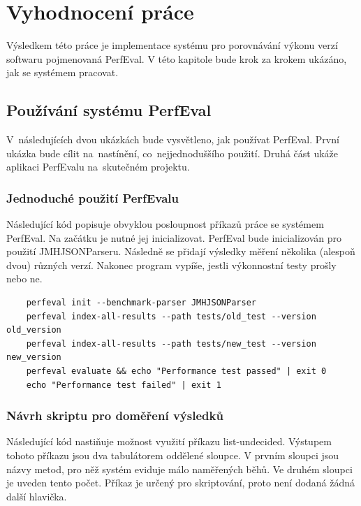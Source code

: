 \chapter{Vyhodnocení práce}

Výsledkem této práce je implementace systému pro porovnávání výkonu verzí softwaru
pojmenovaná PerfEval. V této kapitole bude krok za krokem ukázáno, jak se systémem pracovat.

\section{Používání systému PerfEval}

V~následujících dvou ukázkách bude vysvětleno, jak používat PerfEval. První ukázka bude
cílit na~nastínění, co~nejjednoduššího použití. Druhá část ukáže aplikaci PerfEvalu na~skutečném projektu.

\subsection*{Jednoduché použití PerfEvalu}

Následující kód popisuje obvyklou posloupnost příkazů práce se systémem PerfEval.
Na začátku je nutné jej inicializovat. PerfEval bude inicializován pro použití JMHJSONParseru.
Následně se přidají výsledky měření několika (alespoň dvou) různých verzí.
Nakonec program vypíše, jestli výkonnostní testy prošly nebo ne.

\begin{lstlisting}
    perfeval init --benchmark-parser JMHJSONParser
    perfeval index-all-results --path tests/old_test --version old_version
    perfeval index-all-results --path tests/new_test --version new_version
    perfeval evaluate && echo "Performance test passed" | exit 0
    echo "Performance test failed" | exit 1
\end{lstlisting}

\subsection*{Návrh skriptu pro doměření výsledků}

Následující kód nastiňuje možnost využití příkazu list-undecided. Výstupem tohoto příkazu
jsou dva tabulátorem oddělené sloupce. V prvním sloupci jsou názvy metod, pro něž systém
eviduje málo naměřených běhů. Ve druhém sloupci je uveden tento počet. Příkaz je určený
pro skriptování, proto není dodaná žádná další hlavička.

